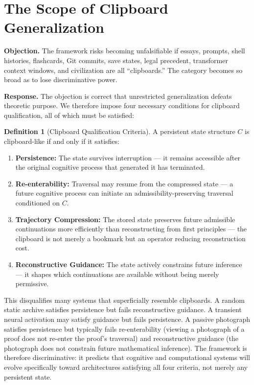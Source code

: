 \documentclass[12pt,oneside]{book}
\theoremstyle{plain}
\theoremstyle{definition}
\newtheorem{definition}[theorem]{Definition}
\theoremstyle{plain}
\begin{document}
\section{The Scope of Clipboard Generalization}

\textbf{Objection.} The framework risks becoming unfalsifiable if essays, prompts, shell histories, flashcards, Git commits, save states, legal precedent, transformer context windows, and civilization are all ``clipboards.'' The category becomes so broad as to lose discriminative power.

\textbf{Response.} The objection is correct that unrestricted generalization defeats theoretic purpose. We therefore impose four necessary conditions for clipboard qualification, all of which must be satisfied:

\begin{definition}[Clipboard Qualification Criteria]
A persistent state structure $C$ is clipboard-like if and only if it satisfies:
\begin{enumerate}[noitemsep]
\item \textbf{Persistence:} The state survives interruption — it remains accessible after the original cognitive process that generated it has terminated.
\item \textbf{Re-enterability:} Traversal may resume from the compressed state — a future cognitive process can initiate an admissibility-preserving traversal conditioned on $C$.
\item \textbf{Trajectory Compression:} The stored state preserves future admissible continuations more efficiently than reconstructing from first principles — the clipboard is not merely a bookmark but an operator reducing reconstruction cost.
\item \textbf{Reconstructive Guidance:} The state actively constrains future inference — it shapes which continuations are available without being merely permissive.
\end{enumerate}
\end{definition}

This disqualifies many systems that superficially resemble clipboards. A random static archive satisfies persistence but fails reconstructive guidance. A transient neural activation may satisfy guidance but fails persistence. A passive photograph satisfies persistence but typically fails re-enterability (viewing a photograph of a proof does not re-enter the proof's traversal) and reconstructive guidance (the photograph does not constrain future mathematical inference). The framework is therefore discriminative: it predicts that cognitive and computational systems will evolve specifically toward architectures satisfying all four criteria, not merely any persistent state.
\end{document}
